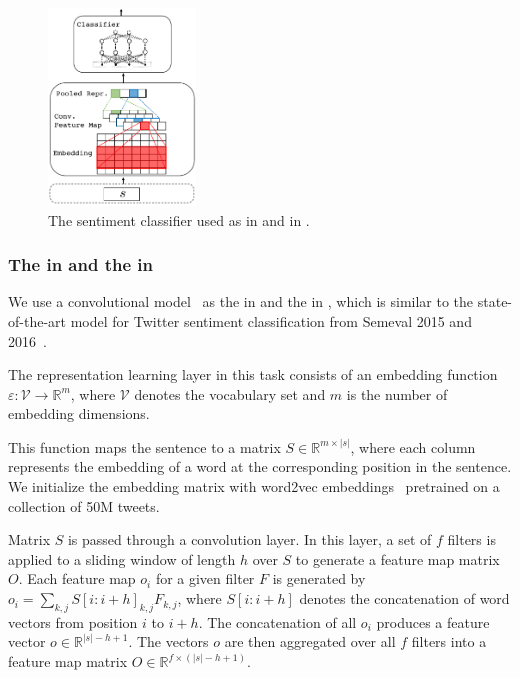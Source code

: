 \begin{figure}[t]
    \centering
            \includegraphics[width=0.35\textwidth]{03-part-02/chapter-05/figs_and_tables/fig_sentiment.pdf}
    \caption{The sentiment classifier used as \tch in \cws and \std in \fwl.}
    \label{fig:sentiment}
\end{figure}


\subsubsection{The \tnet in \cws and the \std in \fwl}
We use a convolutional model~\citep{Kim:2014} as the \tnet in \cws and the \std in \fwl, which is similar to the state-of-the-art model for Twitter sentiment classification from Semeval 2015 and 2016~\cite{Severyn:2015:SemEval,Deriu2016:SemEval,Deriu:2017,Severyn:2015:SIGIR}.

The representation learning layer in this task consists of an embedding function $\varepsilon: \mathcal{V} \rightarrow \mathbb{R}^{m}$, where $\mathcal{V}$ denotes the vocabulary set and $m$ is the number of embedding dimensions.

This function maps the sentence to a matrix $S \in \mathbb{R}^{m \times |s|}$, where each column represents the embedding of a word at the corresponding position in the sentence. We initialize the embedding matrix with word2vec embeddings~\cite{Mikolov:2013} pretrained on a collection of 50M tweets.

Matrix $S$ is passed through a convolution layer.  In this layer, a set of $f$ filters is applied to a sliding window of length $h$ over $S$ to generate a feature map matrix $O$. Each feature map $o_i$ for a given filter $F$ is generated by $o_i = \sum_{k,j}S[i:i+h]_{k,j} F_{k,j}$, where $S[i:i+h]$ denotes the concatenation of word vectors from position $i$ to $i+h$. The concatenation of all $o_i$ produces a feature vector $o \in \mathbb{R}^{|s|-h+1}$. The vectors $o$ are then aggregated over all $f$ filters into a feature map matrix $O \in \mathbb{R}^{f\times(|s|-h+1)}$.

